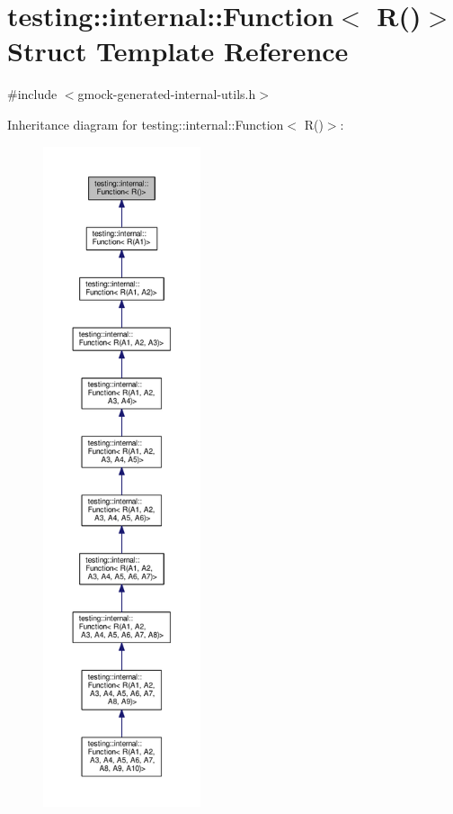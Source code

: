 \hypertarget{structtesting_1_1internal_1_1Function_3_01R_07_08_4}{}\section{testing\+:\+:internal\+:\+:Function$<$ R()$>$ Struct Template Reference}
\label{structtesting_1_1internal_1_1Function_3_01R_07_08_4}


{\ttfamily \#include $<$gmock-\/generated-\/internal-\/utils.\+h$>$}



Inheritance diagram for testing\+:\+:internal\+:\+:Function$<$ R()$>$\+:\nopagebreak
\begin{figure}[H]
\begin{center}
\leavevmode
\includegraphics[height=550pt]{structtesting_1_1internal_1_1Function_3_01R_07_08_4__inherit__graph}
\end{center}
\end{figure}
